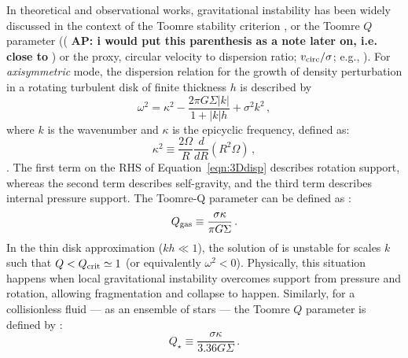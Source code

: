 \IfFileExists{emulateapjlegacy.cls}{\documentclass[iop]{emulateapjlegacy}}{\documentclass[iop]{emulateapj}}
\newcommand{\AP}[1]{({\bf \color{apcolor} AP: #1})}
\begin{document}
In theoretical and observational works, gravitational instability has been widely discussed in the context of the Toomre stability criterion \citep{Toomre64a, Goldreich65b}, or the Toomre $Q$ parameter (\AP{i would put this parenthesis as a note later on, i.e. close to \Eq{q_eff}} or the proxy, circular velocity to dispersion ratio; $v_{\rm circ}/\sigma$; e.g., \citealt{GarciaBurillo03a, Genzel11a, Kassin12a, Leung19a}).
%
For {\it axisymmetric} mode, the dispersion relation for the growth of density perturbation in a rotating turbulent disk of
finite thickness $h$ is described by
\begin{equation}
\omega^2 = \kappa^2 - \frac{2\pi G \Sigma |k|}{1 + |k| h} + \sigma^2 k^2\,,
\label{eqn:3Ddisp}
\end{equation}
where $k$ is the wavenumber and $\kappa$ is the epicyclic frequency, defined as:
\begin{equation}
\kappa^2\equiv\frac{2\Omega}{R}\frac{d}{dR}\left(R^2\Omega\right)\,,
\label{eqn:kappa}
\end{equation}
\citep{Romeo92a}.
The first term on the RHS of Equation~\ref{eqn:3Ddisp} describes rotation support, whereas the second term describes self-gravity, and the third term describes internal pressure support. The Toomre-Q parameter can be defined as \citep{Toomre64a}:
\begin{equation}
Q_{\rm gas}\equiv\frac{\sigma\kappa}{\pi G \Sigma}\,.
\label{eqn:Q}
\end{equation}
In the thin disk approximation ($kh\ll1$), the solution of  is unstable for scales $k$ such that 
$Q < Q_{\rm crit}\simeq1$ (or equivalently $\omega^2 < 0$). Physically, this situation happens when local gravitational instability
overcomes support from pressure and rotation, allowing fragmentation and collapse to happen.
Similarly, for a collisionless fluid --- as an ensemble of stars --- the Toomre $Q$ parameter is defined by \citep{Toomre64a}:
\begin{equation}
Q_{\star} \equiv\frac{\sigma\kappa}{3.36 G \Sigma}\,.
\end{equation}
\end{document}
